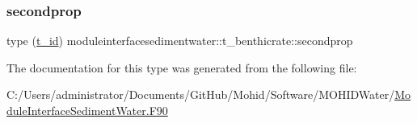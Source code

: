 \subsubsection{\texorpdfstring{secondprop}{secondprop}}
{\footnotesize\ttfamily type (\mbox{\hyperlink{structmoduleinterfacesedimentwater_1_1t__id}{t\+\_\+id}}) moduleinterfacesedimentwater\+::t\+\_\+benthicrate\+::secondprop\hspace{0.3cm}{\ttfamily [private]}}



The documentation for this type was generated from the following file\+:\begin{DoxyCompactItemize}
\item 
C\+:/\+Users/administrator/\+Documents/\+Git\+Hub/\+Mohid/\+Software/\+M\+O\+H\+I\+D\+Water/\mbox{\hyperlink{_module_interface_sediment_water_8_f90}{Module\+Interface\+Sediment\+Water.\+F90}}\end{DoxyCompactItemize}
